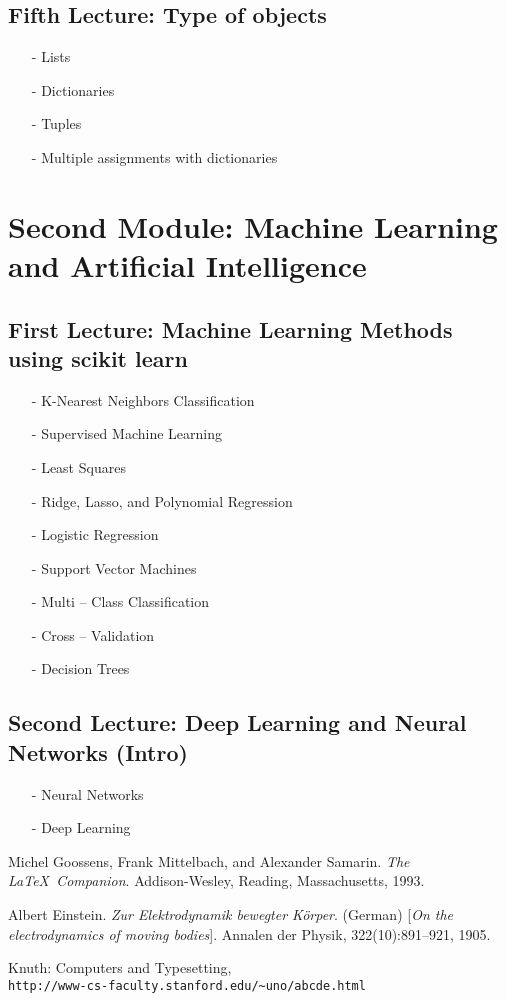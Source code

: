 \documentclass[12pt]{article}
\begin{document}
\subsection*{Fifth Lecture: Type of objects}
\begin{itemize}
\item[-]	Lists
\item[-]	Dictionaries
\item[-]	Tuples
\item[-]	Multiple assignments with dictionaries

\end{itemize}

\section*{Second Module: Machine Learning and Artificial Intelligence}

\subsection*{First Lecture: Machine Learning Methods using scikit learn}
\begin{itemize}
\item[-]	K-Nearest Neighbors Classification
\item[-]	Supervised Machine Learning
\item[-]	Least Squares
\item[-]	Ridge, Lasso, and Polynomial Regression
\item[-]	Logistic Regression
\item[-]	Support Vector Machines
\item[-]	Multi – Class Classification
\item[-]	Cross – Validation
\item[-]	Decision Trees
\end{itemize}

\subsection*{Second Lecture: Deep Learning and Neural Networks (Intro)}
\begin{itemize}
\item[-]	Neural Networks
\item[-]	Deep Learning
\end{itemize}

\newpage

\begin{thebibliography}{9}
Michel Goossens, Frank Mittelbach, and Alexander Samarin. 
\textit{The \LaTeX\ Companion}. 
Addison-Wesley, Reading, Massachusetts, 1993.
 
Albert Einstein. 
\textit{Zur Elektrodynamik bewegter K{\"o}rper}. (German) 
[\textit{On the electrodynamics of moving bodies}]. 
Annalen der Physik, 322(10):891–921, 1905.
 
Knuth: Computers and Typesetting,
\\\texttt{http://www-cs-faculty.stanford.edu/\~{}uno/abcde.html}
\end{thebibliography}
\end{document}
